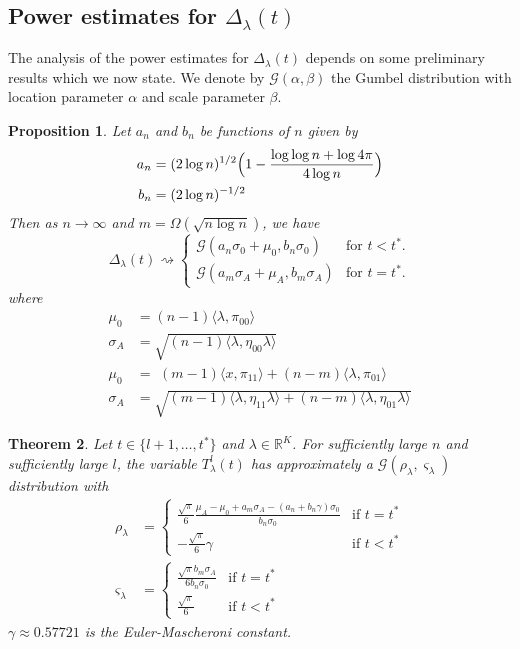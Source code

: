 \documentclass[final]{IEEEtran}
\newtheorem{theorem}{Theorem}
\newtheorem{proposition}[theorem]{Proposition}
\theoremstyle{definition}
\begin{document}
\subsection{Power estimates for $\Delta_{\lambda}(t)$}
The analysis of the power estimates for $\Delta_{\lambda}(t)$ depends
on some preliminary results which we now state. We denote by
$\mathcal{G}(\alpha, \beta)$ the Gumbel distribution with location
parameter $\alpha$ and scale parameter $\beta$.  
\begin{proposition}
  \label{prop:3}
  Let $a_n$ and $b_n$ be functions of $n$ given by
  \begin{align*}
    a_n &= (2 \log{n})^{1/2}\Bigl(1 - \frac{\log{\log{n}} + \log{4\pi}}{4 \log{n}} \Bigr) \\ 
    b_n &= (2 \log{n})^{-1/2}
  \end{align*}
  Then as $n \rightarrow \infty$ and $m = \Omega( \sqrt{n \log{n}})$,
  we have
  \begin{equation}
    \label{eq:14}
    \Delta_{\lambda}(t) \rightsquigarrow \begin{cases}
      \mathcal{G}(a_n \sigma_0 + \mu_0, b_n \sigma_0 ) & \text{for $t < t^{*}$.} \\
     \mathcal{G}(a_m \sigma_A + \mu_A, b_m \sigma_A) &
     \text{for $t = t^{*}$.}
     \end{cases}
  \end{equation}
  where
  \begin{align*}
    \mu_0 &= (n-1)\langle \lambda, \pi_{00} \rangle \\
    \sigma_A &= \sqrt{(n-1)\langle \lambda, \eta_{00} \lambda \rangle} \\
    \mu_0 &= \,\, (m - 1) \langle x, \pi_{11} \rangle + (n-
    m)\langle \lambda, \pi_{01} \rangle
    \\ \sigma_A &= \sqrt{ (m - 1) \langle \lambda, \eta_{11} \lambda \rangle + (n -
      m) \langle \lambda, \eta_{01} \lambda \rangle}
    \end{align*}
\end{proposition}
\begin{theorem}
  \label{thm:8}
  Let $t \in \{l+1, \dots, t^{*}\}$ and $\lambda \in
  \mathbb{R}^{K}$. For sufficiently large $n$ and sufficiently large
  $l$, the variable $T_{\lambda}^{l}(t)$ has approximately a
  $\mathcal{G}(\rho_{\lambda}, \varsigma_{\lambda})$ distribution with
\begin{align}
  \label{eq:13}
  \rho_{\lambda} &= \begin{cases}
    \frac{\sqrt{\pi}}{6} \frac{\mu_A - \mu_0 + a_m\sigma_A - (a_n + b_n
      \gamma)\sigma_0}{b_n \sigma_0} & \text{if $t =
        t^{*}$} \\
      - \frac{ \sqrt{\pi}}{6} \gamma & \text{if $t < t^{*}$}
  \end{cases}\\
  \varsigma_{\lambda} &= \begin{cases}
    \frac{\sqrt{\pi} b_m \sigma_A}{6 b_n \sigma_0} & \text{if $t =
      t^{*}$} \\
    \frac{\sqrt{\pi}}{6} & \text{if $t < t^{*}$}
    \end{cases}
\end{align}
$\gamma \approx 0.57721$ is the Euler-Mascheroni constant.
\end{theorem}
\end{document}
